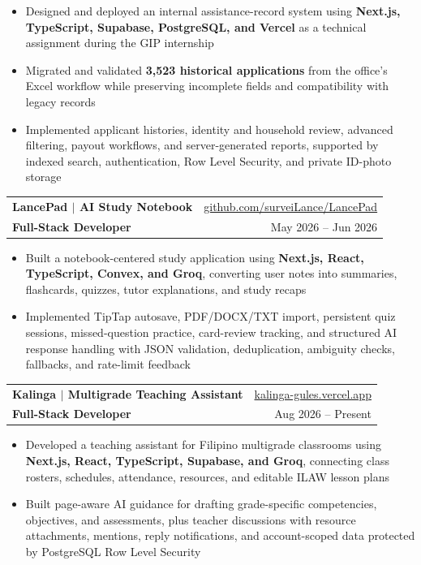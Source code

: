 \documentclass[a4paper,10pt]{article}
\makeatletter
\newenvironment{highlights}{
    \begin{itemize}[
        topsep=0cm,
        parsep=0cm,
        partopsep=0cm,
        itemsep=0.01cm,
        leftmargin=0.48cm
    ]
}{
    \end{itemize}
}
\newcommand{\entryhead}[4]{%
\vspace{0.16cm}
\begin{tabularx}{\linewidth}{@{}X r@{}}
\textbf{#1} & #2 \\
\textbf{#3} & #4 \\
\end{tabularx}%
\vspace{-0.34cm}
}
\makeatother
\begin{document}
\begin{highlights}
    \item Designed and deployed an internal assistance-record system using
    \textbf{Next.js, TypeScript, Supabase, PostgreSQL, and Vercel} as a technical
    assignment during the GIP internship

    \item Migrated and validated \textbf{3,523 historical applications} from the
    office's Excel workflow while preserving incomplete fields and compatibility
    with legacy records

    \item Implemented applicant histories, identity and household review,
    advanced filtering, payout workflows, and server-generated reports, supported
    by indexed search, authentication, Row Level Security, and private ID-photo storage
\end{highlights}

\entryhead
{LancePad $|$ AI Study Notebook}
{\href{https://github.com/surveiLance/LancePad}
{github.com/surveiLance/LancePad}}
{Full-Stack Developer}
{May 2026 -- Jun 2026}

\begin{highlights}
    \item Built a notebook-centered study application using
    \textbf{Next.js, React, TypeScript, Convex, and Groq}, converting user notes
    into summaries, flashcards, quizzes, tutor explanations, and study recaps

    \item Implemented TipTap autosave, PDF/DOCX/TXT import, persistent quiz
    sessions, missed-question practice, card-review tracking, and structured AI
    response handling with JSON validation, deduplication, ambiguity checks,
    fallbacks, and rate-limit feedback
\end{highlights}

\entryhead
{Kalinga $|$ Multigrade Teaching Assistant}
{\href{https://kalinga-gules.vercel.app}
{kalinga-gules.vercel.app}}
{Full-Stack Developer}
{Aug 2026 -- Present}

\begin{highlights}
    \item Developed a teaching assistant for Filipino multigrade classrooms using
    \textbf{Next.js, React, TypeScript, Supabase, and Groq}, connecting class
    rosters, schedules, attendance, resources, and editable ILAW lesson plans

    \item Built page-aware AI guidance for drafting grade-specific competencies,
    objectives, and assessments, plus teacher discussions with resource
    attachments, mentions, reply notifications, and account-scoped data protected
    by PostgreSQL Row Level Security
\end{highlights}
\end{document}
